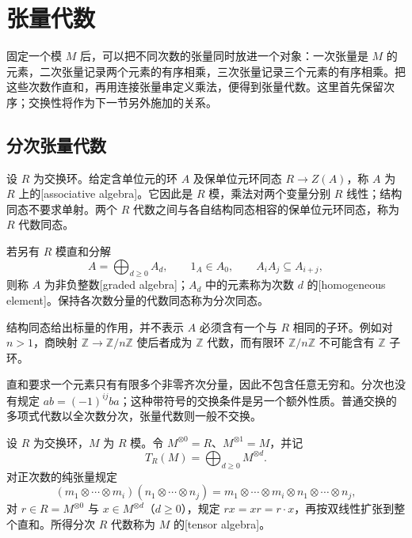 
\section{张量代数}
\label{b2:sec:0802}

固定一个模 \(M\) 后，可以把不同次数的张量同时放进一个对象：一次张量是 \(M\) 的元素，二次张量记录两个元素的有序相乘，三次张量记录三个元素的有序相乘。把这些次数作直和，再用连接张量串定义乘法，便得到张量代数。这里首先保留次序；交换性将作为下一节另外施加的关系。

%
%

\subsection{分次张量代数}
\label{b2:subsec:0802:01}

\begin{definition}\label{b2:def:associative-graded-algebra}
	设 \(R\) 为交换环。给定含单位元的环 \(A\) 及保单位元环同态 \(R\rightarrow Z(A)\)，称 \(A\) 为 \(R\) 上的[associative algebra]。它因此是 \(R\) 模，乘法对两个变量分别 \(R\) 线性；结构同态不要求单射。两个 \(R\) 代数之间与各自结构同态相容的保单位元环同态，称为 \(R\) 代数同态。

	若另有 \(R\) 模直和分解
	\[
		A=\bigoplus_{d\ge0}A_d,\qquad 1_A\in A_0,\qquad A_iA_j\subseteq A_{i+j},
	\]
	则称 \(A\) 为非负整数[graded algebra]；\(A_d\) 中的元素称为次数 \(d\) 的[homogeneous element]。保持各次数分量的代数同态称为分次同态。
\end{definition}

结构同态给出标量的作用，并不表示 \(A\) 必须含有一个与 \(R\) 相同的子环。例如对 \(n>1\)，商映射 \(\mathbb Z\rightarrow\mathbb Z/n\mathbb Z\) 使后者成为 \(\mathbb Z\) 代数，而有限环 \(\mathbb Z/n\mathbb Z\) 不可能含有 \(\mathbb Z\) 子环。

\ProseParagraphBreak
直和要求一个元素只有有限多个非零齐次分量，因此不包含任意无穷和。分次也没有规定 \(ab=(-1)^{ij}ba\)；这种带符号的交换条件是另一个额外性质。普通交换的多项式代数以全次数分次，张量代数则一般不交换。

\begin{definition}\label{b2:def:tensor-algebra}
	设 \(R\) 为交换环，\(M\) 为 \(R\) 模。令 \(M^{\otimes0}=R\)、\(M^{\otimes1}=M\)，并记
	\[
		T_R(M)=\bigoplus_{d\ge0}M^{\otimes d}.
	\]
	对正次数的纯张量规定
	\[
		(m_1\otimes\cdots\otimes m_i)(n_1\otimes\cdots\otimes n_j) =m_1\otimes\cdots\otimes m_i\otimes n_1\otimes\cdots\otimes n_j,
	\]
	对 \(r\in R=M^{\otimes0}\) 与 \(x\in M^{\otimes d}\)（\(d\ge0\)），规定 \(rx=xr=r\cdot x\)，再按双线性扩张到整个直和。所得分次 \(R\) 代数称为 \(M\) 的[tensor algebra]。
\end{definition}

